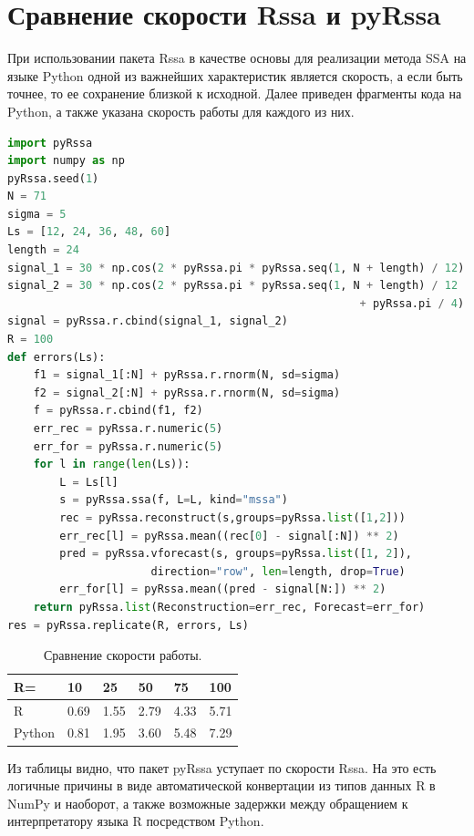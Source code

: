 \documentclass[specialist,
			   substylefile = spbu_report.rtx,
			   subf,href,colorlinks=true, 12pt]{disser}
\begin{document}
\chapter{Сравнение скорости Rssa и pyRssa}

При использовании пакета Rssa в качестве основы для реализации метода SSA на языке Python одной из важнейших характеристик является скорость, а если быть точнее, то ее сохранение близкой к исходной. Далее приведен фрагменты кода на Python, а также указана скорость работы для каждого из них.

\begin{lstlisting}[language=Python, caption=Программный код для анализа скорости работы на Python.]
import pyRssa
import numpy as np
pyRssa.seed(1)
N = 71
sigma = 5
Ls = [12, 24, 36, 48, 60]
length = 24
signal_1 = 30 * np.cos(2 * pyRssa.pi * pyRssa.seq(1, N + length) / 12)
signal_2 = 30 * np.cos(2 * pyRssa.pi * pyRssa.seq(1, N + length) / 12 
                                                      + pyRssa.pi / 4)
signal = pyRssa.r.cbind(signal_1, signal_2)
R = 100
def errors(Ls):
	f1 = signal_1[:N] + pyRssa.r.rnorm(N, sd=sigma)
	f2 = signal_2[:N] + pyRssa.r.rnorm(N, sd=sigma)
	f = pyRssa.r.cbind(f1, f2)
	err_rec = pyRssa.r.numeric(5)
	err_for = pyRssa.r.numeric(5)
	for l in range(len(Ls)):
		L = Ls[l]
		s = pyRssa.ssa(f, L=L, kind="mssa")
		rec = pyRssa.reconstruct(s,groups=pyRssa.list([1,2]))
		err_rec[l] = pyRssa.mean((rec[0] - signal[:N]) ** 2)
		pred = pyRssa.vforecast(s, groups=pyRssa.list([1, 2]), 
                      direction="row", len=length, drop=True)
		err_for[l] = pyRssa.mean((pred - signal[N:]) ** 2)
	return pyRssa.list(Reconstruction=err_rec, Forecast=err_for)
res = pyRssa.replicate(R, errors, Ls)
\end{lstlisting}

\begin{table}[htp]
\centering
\begin{tabular}{ | l | l | l | l | l | l |}
	\hline
	R= & 10 & 25 & 50 & 75 & 100 \\ \hline
	R & 0.69 & 1.55 & 2.79 & 4.33 & 5.71  \\
	Python & 0.81 & 1.95 & 3.60 & 5.48 & 7.29 \\
	\hline
\end{tabular}
\caption{\label{tab:r-py-table} Сравнение скорости работы.}
\end{table}

Из таблицы видно, что пакет pyRssa уступает по скорости Rssa. На это есть логичные причины в виде автоматической конвертации из типов данных R в NumPy и наоборот, а также возможные задержки между обращением к интерпретатору языка R посредством Python.
\end{document}
